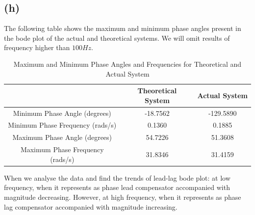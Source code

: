 \documentclass[letterpaper]{article}
\begin{document}
\subsection*{(h)}
The following table shows the maximum and minimum phase angles present in the bode plot of the actual and theoretical systems. We will omit results of frequency higher than $100 Hz$. 
\begin{table}[hbt]
\begin{center}
	\begin{tabular}{|c|c|c|}
		\hline
		 & \textbf{Theoretical System} & \textbf{Actual System}  \\ \hline
		Minimum Phase Angle (degrees) & -18.7562 &  -129.5890\\
		Minimum Phase Frequency (rads/s) & 0.1360 & 0.1885\\
		Maximum Phase Angle (degrees) & 54.7226 & 51.3608 \\ 
		Maximum Phase Frequency (rads/s) & 31.8346 &  31.4159\\ \hline
	\end{tabular}
\caption{Maximum and Minimum Phase Angles and Frequencies for Theoretical and Actual System}
\label{q1_th}
\end{center}
\end{table}

When we analyse the data and find the trends of lead-lag bode plot: at low frequency, when it represents as phase lead compensator accompanied with magnitude decreasing. However, at high frequency, when it represents as phase lag compensator accompanied with magnitude increasing.
\end{document}
